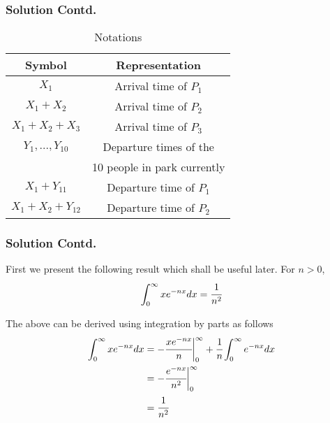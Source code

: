 \documentclass{beamer}
\begin{document}
\begin{frame}
\frametitle{Solution Contd.}

\begin{table}
    \centering
    \begin{tabular}{|c|c|}
    \hline
    Symbol  & Representation  \\
    \hline
    $X_1$            & Arrival time of $P_1$  \\
    $X_1+X_2$        & Arrival time of $P_2$  \\
    $X_1+X_2+X_3$    & Arrival time of $P_3$  \\
    \hline
    $Y_1,...,Y_{10}$ & Departure times of the  \\
                     & 10 people in park currently\\
    \hline
    $X_1+Y_{11}$     & Departure time of $P_1$\\
    $X_1+X_2+Y_{12}$ & Departure time of $P_2$\\
    \hline
    \end{tabular}
    \caption{Notations}
    \label{tab:my_label}
\end{table}

\end{frame}
\begin{frame}
\frametitle{Solution Contd.}

First we present the following result which shall be useful later. For $n>0$,
\begin{align}
    \int_0^{\infty} xe^{-nx}dx = \cfrac{1}{n^2}\label{integrationresult}
\end{align}

The above can be derived using integration by parts as follows
\begin{align}
    \int_0^{\infty} xe^{-nx} dx &= -\cfrac{xe^{-nx}}{n} \biggr \vert_0^{\infty} 
                                   + \cfrac{1}{n} \int_0^{\infty}e^{-nx}dx\\
                                &= -\cfrac{e^{-nx}}{n^2}\biggr \vert_0^{\infty}\\
                                &= \cfrac{1}{n^2}
\end{align}

\end{frame}
\end{document}
